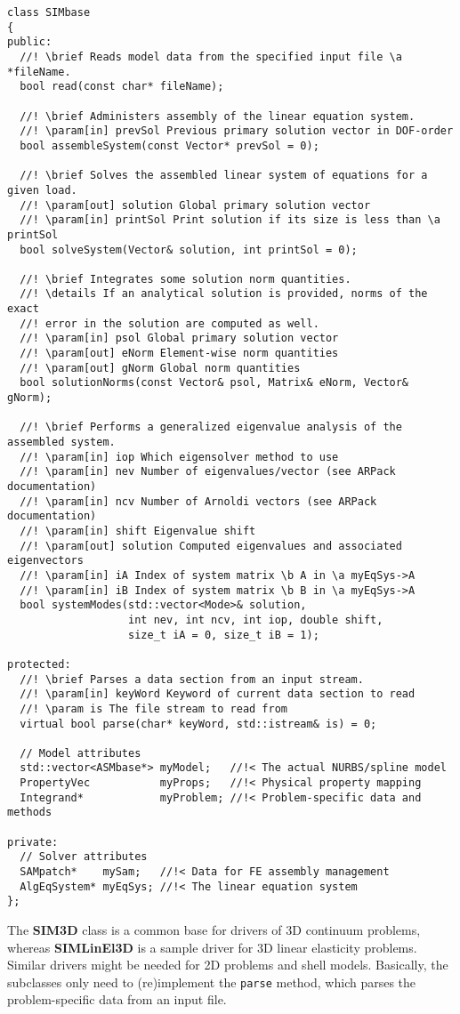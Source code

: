 \documentclass{article}
\begin{document}
{\small\begin{verbatim}
class SIMbase
{
public:
  //! \brief Reads model data from the specified input file \a *fileName.
  bool read(const char* fileName);

  //! \brief Administers assembly of the linear equation system.
  //! \param[in] prevSol Previous primary solution vector in DOF-order
  bool assembleSystem(const Vector* prevSol = 0);

  //! \brief Solves the assembled linear system of equations for a given load.
  //! \param[out] solution Global primary solution vector
  //! \param[in] printSol Print solution if its size is less than \a printSol
  bool solveSystem(Vector& solution, int printSol = 0);

  //! \brief Integrates some solution norm quantities.
  //! \details If an analytical solution is provided, norms of the exact
  //! error in the solution are computed as well.
  //! \param[in] psol Global primary solution vector
  //! \param[out] eNorm Element-wise norm quantities
  //! \param[out] gNorm Global norm quantities
  bool solutionNorms(const Vector& psol, Matrix& eNorm, Vector& gNorm);

  //! \brief Performs a generalized eigenvalue analysis of the assembled system.
  //! \param[in] iop Which eigensolver method to use
  //! \param[in] nev Number of eigenvalues/vector (see ARPack documentation)
  //! \param[in] ncv Number of Arnoldi vectors (see ARPack documentation)
  //! \param[in] shift Eigenvalue shift
  //! \param[out] solution Computed eigenvalues and associated eigenvectors
  //! \param[in] iA Index of system matrix \b A in \a myEqSys->A
  //! \param[in] iB Index of system matrix \b B in \a myEqSys->A
  bool systemModes(std::vector<Mode>& solution,
                   int nev, int ncv, int iop, double shift,
                   size_t iA = 0, size_t iB = 1);

protected:
  //! \brief Parses a data section from an input stream.
  //! \param[in] keyWord Keyword of current data section to read
  //! \param is The file stream to read from
  virtual bool parse(char* keyWord, std::istream& is) = 0;

  // Model attributes
  std::vector<ASMbase*> myModel;   //!< The actual NURBS/spline model
  PropertyVec           myProps;   //!< Physical property mapping
  Integrand*            myProblem; //!< Problem-specific data and methods

private:
  // Solver attributes
  SAMpatch*    mySam;   //!< Data for FE assembly management
  AlgEqSystem* myEqSys; //!< The linear equation system
};
\end{verbatim}}
%
The {\bf SIM3D} class is a common base for drivers of 3D continuum problems,
whereas {\bf SIMLinEl3D} is a sample driver for 3D linear elasticity problems.
Similar drivers might be needed for 2D problems and shell models.
Basically, the subclasses only need to (re)implement the {\tt parse} method,
which parses the problem-specific data from an input file.
\end{document}
